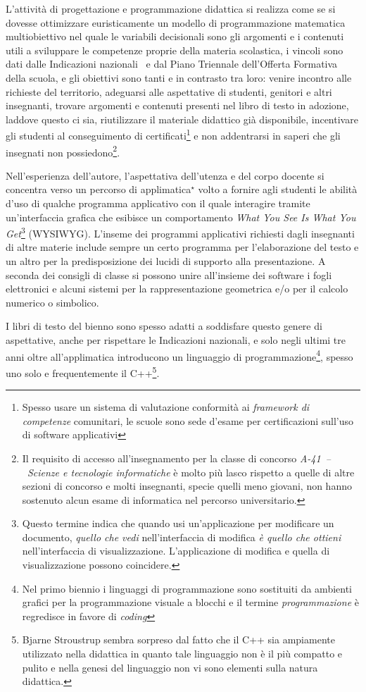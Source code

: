 \documentclass[a4paper]{easychair}
\begin{document}
L'attività di progettazione e programmazione didattica
si realizza come se si dovesse ottimizzare euristicamente
un modello di programmazione matematica multiobiettivo
nel quale le variabili decisionali sono gli argomenti e i contenuti
utili a sviluppare le competenze proprie della materia scolastica,
i vincoli sono dati dalle Indicazioni nazionali~\cite{IlMinistro2010} e
dal Piano Triennale dell'Offerta Formativa della scuola, e
gli obiettivi sono tanti e in contrasto tra loro:
venire incontro alle richieste del territorio,
adeguarsi alle aspettative di studenti, genitori e altri insegnanti,
trovare argomenti e contenuti presenti nel libro di testo in adozione, laddove questo ci sia,
riutilizzare il materiale didattico già disponibile,
incentivare gli studenti al conseguimento di certificati\footnote{Spesso
usare un sistema di valutazione conformità ai \textit{framework di competenze} comunitari,
le scuole sono sede d'esame per certificazioni sull'uso di software applicativi} e
non addentrarsi in saperi che gli insegnati non possiedono\footnote{Il requisito di accesso all'insegnamento per la classe di concorso \textit{A-41~--~Scienze e tecnologie informatiche} è molto più lasco rispetto a quelle di altre sezioni di concorso e molti insegnanti, specie quelli meno giovani, non hanno sostenuto alcun esame di informatica nel percorso universitario.}.

Nell'esperienza dell'autore, l'aspettativa dell'utenza e del corpo docente si concentra
verso un percorso di applimatica$\phantom{}^\star$ volto a fornire agli studenti
le abilità d'uso di qualche programma applicativo con il quale interagire tramite
un'interfaccia grafica che esibisce un comportamento \textit{What You See Is What You Get}\footnote{Questo termine indica che quando usi un'applicazione per modificare un documento, \textit{quello che vedi} nell'interfaccia di modifica \textit{è quello che ottieni} nell'interfaccia di visualizzazione. L'applicazione di modifica e quella di visualizzazione possono coincidere.} (WYSIWYG).
L'inseme dei programmi applicativi richiesti dagli insegnanti di altre materie
include sempre un certo programma per l'elaborazione del testo e
un altro per la predisposizione dei lucidi di supporto alla presentazione.
A seconda dei consigli di classe si possono unire all'insieme dei software i fogli elettronici
e alcuni sistemi per la rappresentazione geometrica e/o per il calcolo numerico o simbolico.

I libri di testo del bienno sono spesso adatti a soddisfare questo genere di aspettative, anche per rispettare le Indicazioni nazionali,
e solo negli ultimi tre anni oltre all'applimatica introducono un linguaggio di programmazione\footnote{%
Nel primo biennio i linguaggi di programmazione sono sostituiti da ambienti grafici per la programmazione visuale a blocchi e il termine \textit{programmazione} è regredisce in favore di \textit{coding}},
spesso uno solo e frequentemente il C++\footnote{Bjarne Stroustrup sembra sorpreso dal fatto che il C++ sia ampiamente utilizzato nella didattica in quanto tale linguaggio non è il più compatto e pulito e nella genesi del linguaggio non vi sono elementi sulla natura didattica.%
}.
\end{document}
